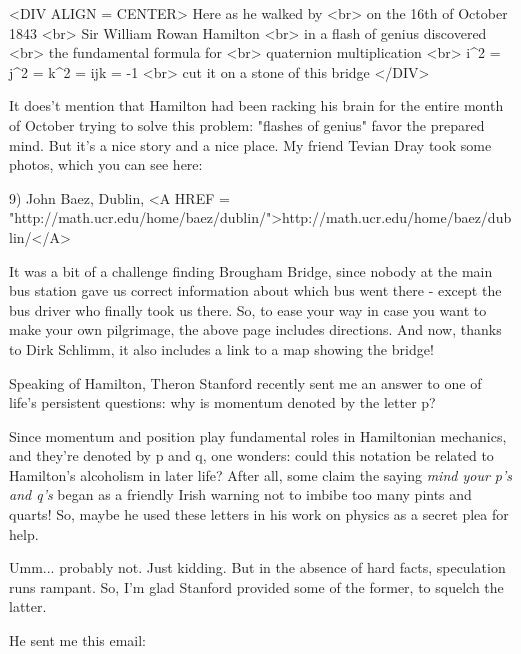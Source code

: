 <DIV ALIGN = CENTER>
                    Here as he walked by <br>
                 on the 16th of October 1843 <br>
                 Sir William Rowan Hamilton <br>
               in a flash of genius discovered <br>
                the fundamental formula for <br>
                 quaternion multiplication <br>
                i^{2} = j^{2} = k^{2} = ijk = -1 <br>
             \text{\&}  cut it on a stone of this bridge
</DIV>

It does't mention that Hamilton had been racking his brain for the
entire month of October trying to solve this problem: "flashes of
genius" favor the prepared mind.  But it's a nice story and a nice place.
My friend Tevian Dray took some photos, which you can see here:

9) John Baez, Dublin, <A HREF = "http://math.ucr.edu/home/baez/dublin/">http://math.ucr.edu/home/baez/dublin/</A>

It was a bit of a challenge finding Brougham Bridge, since nobody at the main
bus station gave us correct information about which bus went there - except 
the bus driver who finally took us there.  So, to ease your way in case
you want to make your own pilgrimage, the above page includes directions. 
And now, thanks to Dirk Schlimm, it also includes a link to a map showing 
the bridge!  

Speaking of Hamilton, Theron Stanford recently sent me an answer to one of 
life's persistent questions: why is momentum denoted by the letter p?  

Since momentum and position play fundamental roles in Hamiltonian mechanics, 
and they're denoted by p and q, one wonders: could this notation be related 
to Hamilton's alcoholism in later life?  After all, some claim the saying 
\emph{mind your p's and q's} began as a friendly Irish warning not
to imbibe too many pints and quarts!  So, maybe he used these letters
in his work on physics as a secret plea for help.

Umm... probably not.  Just kidding.  But in the absence of hard facts, 
speculation runs rampant.  So, I'm glad Stanford provided some of the former, 
to squelch the latter.

He sent me this email:



